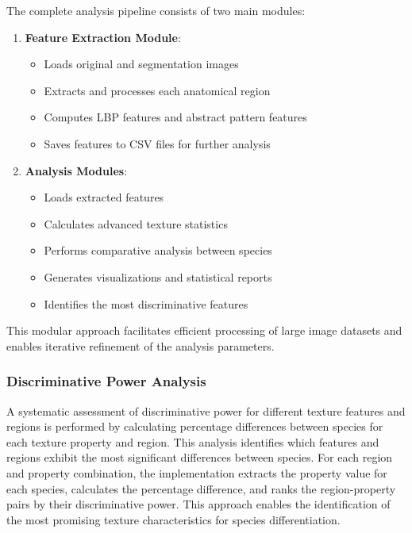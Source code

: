 \documentclass[a4paper,12pt]{report}
\begin{document}
The complete analysis pipeline consists of two main modules:

\begin{enumerate}
    \item \textbf{Feature Extraction Module}:
    \begin{itemize}
        \item Loads original and segmentation images
        \item Extracts and processes each anatomical region
        \item Computes LBP features and abstract pattern features
        \item Saves features to CSV files for further analysis
    \end{itemize}

    \item \textbf{Analysis Modules}:
    \begin{itemize}
        \item Loads extracted features
        \item Calculates advanced texture statistics
        \item Performs comparative analysis between species
        \item Generates visualizations and statistical reports
        \item Identifies the most discriminative features
    \end{itemize}
\end{enumerate}

This modular approach facilitates efficient processing of large image datasets and enables iterative refinement of the analysis parameters.

\subsubsection{Discriminative Power Analysis}
A systematic assessment of discriminative power for different texture features and regions is performed by calculating percentage differences between species for each texture property and region. This analysis identifies which features and regions exhibit the most significant differences between species. For each region and property combination, the implementation extracts the property value for each species, calculates the percentage difference, and ranks the region-property pairs by their discriminative power. This approach enables the identification of the most promising texture characteristics for species differentiation.
\end{document}
